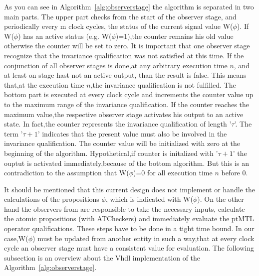 As you can see in Algorithm~\ref{alg:observerstage} the algorithm is separated in two main parts. 
The upper part checks from the start of the observer stage, and periodically every m clock cycles,
the status of the current signal value W($\phi$). If W($\phi$) has an active status (e.g. W($\phi$)=1),the counter remains his old value otherwise the counter will be set to zero.
It is important that one observer stage recognize that the invariance qualification was not satisfied
at this time. If the conjunction of all observer stages is done,at any arbitrary execution time $n$, and at least on stage hast not an active output,
than the result is false. This means that,at the execution time $n$,the invariance qualification is not fulfilled.
The bottom part is executed at every clock cycle and increments the counter value up to the maximum range of the invariance qualification.
If the counter reaches the maximum value,the respective observer stage activates his output to an active state. In fact,the counter represents the invariance qualification of length
'$\tau$'. The term '$\tau + 1$' indicates that the present value must also be involved in the invariance qualification.
The counter value will be initialized with zero at the beginning of the algorithm. Hypothetical,if counter is initalized with '$\tau + 1$' the ouptut is activated immediately,because
of the bottom algorithm. But this is an contradiction to the assumption that  W($\phi$)=0 for all execution time $n$ before 0.

It should be mentioned that this current design does not implement or handle the calculations of the propositions $\phi$, 
which is indicated with W($\phi$). On the other hand the observers from \cite{RTFMBJ13} are responsible to take the necessary inputs,
calculate the atomic propositions (with ATCheckers) and immediately evaluate the ptMTL operator qualifications.
These steps have to be done in a tight time bound.
In our case,W($\phi$) must be updated from another entity in such a way,that at every clock cycle an observer stage must have a consistent value for evaluation.
The following subsection is an overview about the Vhdl implementation of the Algorithm~\ref{alg:observerstage}.

